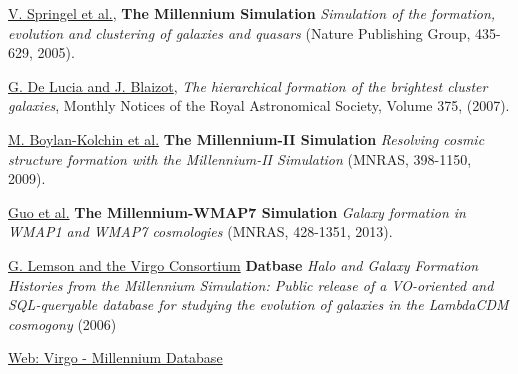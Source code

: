 \documentclass[a4paper, amsfonts, amssymb, amsmath, reprint, showkeys, nofootinbib, twoside]{revtex4-1}
\begin{document}
\begin{thebibliography}{6}
\href{https://ui.adsabs.harvard.edu/abs/2005Natur.435..629S/abstract}{V. Springel et al.},
\textbf{The Millennium Simulation}
\textit{Simulation of the formation, evolution and clustering of galaxies and quasars}
(Nature Publishing Group, 435-629, 2005).

\href{https://ui.adsabs.harvard.edu/abs/2007MNRAS.375....2D/abstract}{G. De Lucia and J. Blaizot},
\textit{The hierarchical formation of the brightest cluster galaxies},
Monthly Notices of the Royal Astronomical Society, Volume 375, (2007).

\href{https://ui.adsabs.harvard.edu/abs/2009MNRAS.398.1150B/abstract}{M. Boylan-Kolchin et al.} 
\textbf{The Millennium-II Simulation}
\textit{Resolving cosmic structure formation with the Millennium-II Simulation}
(MNRAS, 398-1150, 2009).

\href{https://ui.adsabs.harvard.edu/abs/2013MNRAS.428.1351G/abstract}{Guo et al.} 
\textbf{The Millennium-WMAP7 Simulation}
\textit{Galaxy formation in WMAP1 and WMAP7 cosmologies}
(MNRAS, 428-1351, 2013).

\href{https://ui.adsabs.harvard.edu/abs/2006astro.ph..8019L/abstract}{G. Lemson and the Virgo Consortium} 
\textbf{Datbase}
\textit{Halo and Galaxy Formation Histories from the Millennium Simulation: Public release of a VO-oriented and SQL-queryable database for studying the evolution of galaxies in the LambdaCDM cosmogony}
(2006)

\href{http://gavo.mpa-garching.mpg.de/Millennium/}{Web: Virgo - Millennium Database}
\end{thebibliography}




\end{document}
